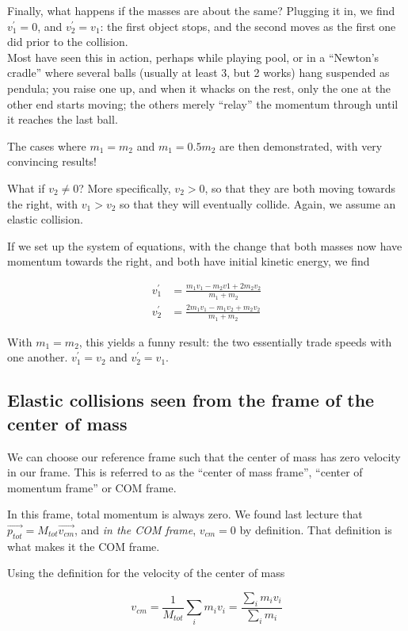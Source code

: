 \documentclass[12pt,a4paper]{report}
\begin{document}
Finally, what happens if the masses are about the same? Plugging it in, we find $v_1^{'} = 0$, and $v_2^{'} = v_1$: the first object stops, and the second moves as the first one did prior to the collision.\\
Most have seen this in action, perhaps while playing pool, or in a ``Newton's cradle'' where several balls (usually at least 3, but 2 works) hang suspended as pendula; you raise one up, and when it whacks on the rest, only the one at the other end starts moving; the others merely ``relay'' the momentum through until it reaches the last ball.

The cases where $m_1 = m_2$ and $m_1 = 0.5 m_2$ are then demonstrated, with very convincing results!

What if $v_2 \neq 0$? More specifically, $v_2 > 0$, so that they are both moving towards the right, with $v_1 > v_2$ so that they will eventually collide. Again, we assume an elastic collision.

If we set up the system of equations, with the change that both masses now have momentum towards the right, and both have initial kinetic energy, we find 

\begin{align}
v_1^{'} &= \frac{m_1 v_1 - m_2 v1 + 2 m_2 v_2}{m_1 + m_2}\\
v_2^{'} &= \frac{2 m_1 v_1 - m_1 v_2 + m_2 v_2}{m_1 + m_2}
\end{align}

With $m_1 = m_2$, this yields a funny result: the two essentially trade speeds with one another. $v_1^{'} = v_2$ and $v_2^{'} = v_1$.

\subsection{Elastic collisions seen from the frame of the center of mass}

We can choose our reference frame such that the center of mass has zero velocity in our frame. This is referred to as the ``center of mass frame'', ``center of momentum frame'' or COM frame.

In this frame, total momentum is always zero. We found last lecture that $\vec{p_{tot}} = M_{tot} \vec{v_{cm}}$, and \emph{in the COM frame}, $v_{cm} = 0$ by definition. That definition is what makes it the COM frame.

Using the definition for the velocity of the center of mass

\begin{equation}
v_{cm} = \frac{1}{M_{tot}} \sum_i m_i v_i = \frac{\sum_i m_i v_i}{\sum_i m_i}
\end{equation}
\end{document}
